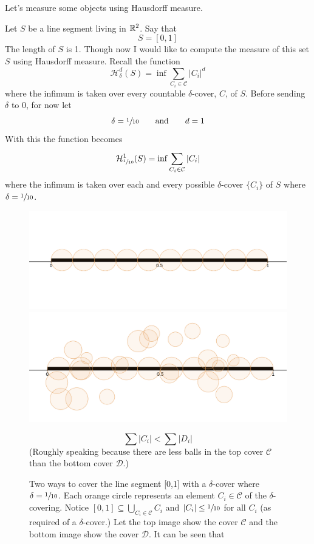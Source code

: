 \documentclass[11pt]{ekblite}
\begin{document}
Let's measure some objects using Hausdorff measure.
\begin{example}
	Let $S$ be a line segment living in $\mathbb{R}^2$. Say that
	\[S = [0,1]\]
	The length of $S$ is 1. Though now I would like to compute the measure of this set $S$ using Hausdorff measure. Recall the function
	\[\mathcal{H}_{\delta}^d (S) = \inf \sum_{C_i \in \mathcal{C}} |C_i|^d\]
	where the infimum is taken over every countable $\delta$-cover, $C$, of $S$. Before sending $\delta$ to 0, for now let
	\[\delta = \sfrac{1}{10} \qquad \text{and} \qquad d = 1\]
	With this the function becomes
	\[\mathcal{H}_{\sfrac{1}{10}}^{1} (S) = \inf \sum_{C_i \in \mathcal{C}}^{} |C_i|\]
	where the infimum is taken over each and every possible $\delta$-cover $\{C_i\}$ of $S$ where $\delta = \sfrac{1}{10}$.
	\begin{figure}[h]
		\includegraphics[scale=0.25]{img/c19.jpg}
		\includegraphics[scale=0.26]{img/c18.jpg}
		\caption{Two ways to cover the line segment [0,1] with a $\delta$-cover where $\delta = \sfrac{1}{10}$. Each orange circle represents an element $C_i \in \mathcal{C}$ of the $\delta$-covering. Notice $[0,1] \subseteq \bigcup_{C_i \in \mathcal{C}} C_i$ and $|C_i| \le \sfrac{1}{10}$ for all $C_i$ (as required of a $\delta$-cover.) Let the top image show the cover $\mathcal{C}$ and the bottom image show the cover $\mathcal{D}$. It can be seen that}
		\[\sum |C_i| < \sum |D_i|\]
		(Roughly speaking because there are less balls in the top cover $\mathcal{C}$ than the bottom cover $\mathcal{D}$.) 

\end{figure}
\end{example}
\end{document}
